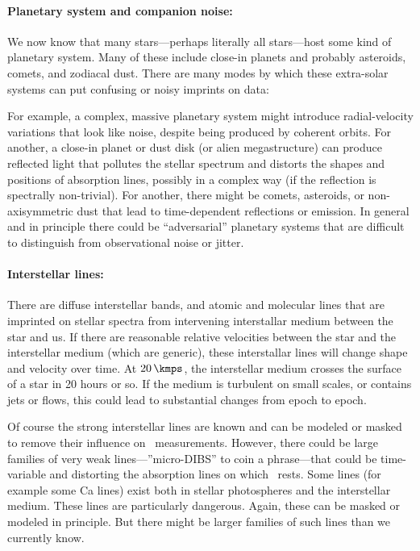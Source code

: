 \documentclass[12pt, fullpage, letterpaper]{article}
\begin{document}
\paragraph{Planetary system and companion noise:}
We now know that many stars---perhaps literally all stars---host some
kind of planetary system.
Many of these include close-in planets and probably asteroids, comets,
and zodiacal dust.
There are many modes by which these extra-solar systems can put
confusing or noisy imprints on \EPRV data:

For example, a complex, massive planetary system might introduce
radial-velocity variations that look like noise, despite being
produced by coherent orbits.
For another, a close-in planet or dust disk (or alien
megastructure) can produce reflected light that pollutes the stellar
spectrum and distorts the shapes and positions of absorption lines,
possibly in a complex way (if the reflection is spectrally
non-trivial).
For another, there might be comets, asteroids, or non-axisymmetric
dust that lead to time-dependent reflections or emission.
In general and in principle there could be ``adversarial'' planetary
systems that are difficult to distinguish from observational noise or
jitter.

\paragraph{Interstellar lines:}
There are diffuse interstellar bands, and atomic and molecular lines
that are imprinted on stellar spectra from intervening interstallar
medium between the star and us.
If there are reasonable relative velocities between the star and the
interstellar medium (which are generic), these interstallar lines will
change shape and velocity over time.
At $20\,\kmps$, the interstellar medium crosses the surface of a star
in 20 hours or so. If the medium is turbulent on small scales, or contains
jets or flows, this
could lead to substantial changes from epoch to epoch.

Of course the strong interstellar lines are known and can be modeled or masked
to remove their influence on \EPRV\ measurements.
However, there could be large families of very weak
lines---''micro-DIBS'' to coin a phrase---that could be time-variable
and distorting the absorption lines on which \EPRV\ rests.
Some lines (for example some Ca lines) exist both in stellar photospheres
and the interstellar medium. These lines are particularly dangerous.
Again, these can be masked or modeled in principle. But there might be
larger families of such lines than we currently know.
\end{document}
